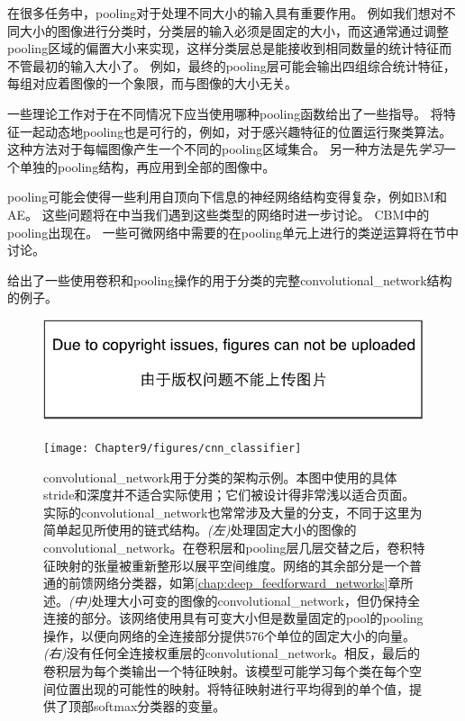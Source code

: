  
在很多任务中，\gls{pooling}对于处理不同大小的输入具有重要作用。
例如我们想对不同大小的图像进行分类时，分类层的输入必须是固定的大小，而这通常通过调整\gls{pooling}区域的偏置大小来实现，这样分类层总是能接收到相同数量的统计特征而不管最初的输入大小了。
例如，最终的\gls{pooling}层可能会输出四组综合统计特征，每组对应着图像的一个象限，而与图像的大小无关。

一些理论工作对于在不同情况下应当使用哪种\gls{pooling}函数给出了一些指导\citep{boureau-icml-10}。
将特征一起动态地\gls{pooling}也是可行的，例如，对于感兴趣特征的位置运行聚类算法\citep{boureau-iccv-11}。
这种方法对于每幅图像产生一个不同的\gls{pooling}区域集合。
另一种方法是先\emph{学习}一个单独的\gls{pooling}结构，再应用到全部的图像中\citep{jia2012beyond}。

\gls{pooling}可能会使得一些利用自顶向下信息的神经网络结构变得复杂，例如\gls{BM}和\gls{AE}。
这些问题将在中当我们遇到这些类型的网络时进一步讨论。
\gls{CBM}中的\gls{pooling}出现在。
一些可微网络中需要的在\gls{pooling}单元上进行的类逆运算将在节中讨论。

给出了一些使用卷积和\gls{pooling}操作的用于分类的完整\gls{convolutional_network}结构的例子。
\begin{figure}[!htb]
\ifOpenSource
\centerline{\includegraphics{figure.pdf}}
\else
\centerline{\texttt{[image: Chapter9/figures/cnn\_classifier]}}
\fi
\caption{\gls{convolutional_network}用于分类的架构示例。本图中使用的具体\gls{stride}和深度并不适合实际使用；它们被设计得非常浅以适合页面。实际的\gls{convolutional_network}也常常涉及大量的分支，不同于这里为简单起见所使用的链式结构。\emph{(左)}处理固定大小的图像的\gls{convolutional_network}。在卷积层和\gls{pooling}层几层交替之后，卷积特征映射的张量被重新整形以展平空间维度。网络的其余部分是一个普通的前馈网络分类器，如第\ref{chap:deep_feedforward_networks}章所述。\emph{(中)}处理大小可变的图像的\gls{convolutional_network}，但仍保持全连接的部分。该网络使用具有可变大小但是数量固定的\gls{pool}的\gls{pooling}操作，以便向网络的全连接部分提供576个单位的固定大小的向量。 \emph{(右)}没有任何全连接权重层的\gls{convolutional_network}。相反，最后的卷积层为每个类输出一个特征映射。该模型可能学习每个类在每个空间位置出现的可能性的映射。将特征映射进行平均得到的单个值，提供了顶部softmax分类器的变量。}
\label{fig:chap9_cnn_classifier}
\end{figure}

